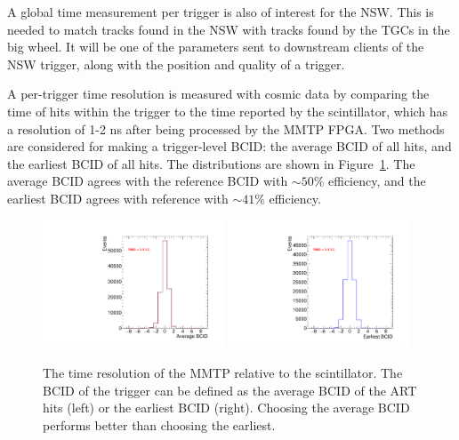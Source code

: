 A global time measurement per trigger is also of interest for the NSW. This is needed to match tracks found in the NSW with tracks found by the TGCs in the big wheel. It will be one of the parameters sent to downstream clients of the NSW trigger, along with the position and quality of a trigger.

A per-trigger time resolution is measured with cosmic data by comparing the time of hits within the trigger to the time reported by the scintillator, which has a resolution of 1-2 ns after being processed by the MMTP FPGA. Two methods are considered for making a trigger-level BCID: the average BCID of all hits, and the earliest BCID of all hits. The distributions are shown in Figure~\ref{fig:timeres}. The average BCID agrees with the reference BCID with $\sim\!50\%$ efficiency, and the earliest BCID agrees with reference with $\sim\!41\%$ efficiency.

\begin{figure}[!htpb]
  \begin{center}
    \includegraphics[width=0.48\textwidth]{figures/gbtanalysis3522/avg_BCID.pdf}
    \includegraphics[width=0.48\textwidth]{figures/gbtanalysis3522/earliest_BCID.pdf}
  \end{center}
  \vspace{-10pt}
  \caption{The time resolution of the MMTP relative to the scintillator. The BCID of the trigger can be defined as the average BCID of the ART hits (left) or the earliest BCID (right). Choosing the average BCID performs better than choosing the earliest.}
  \label{fig:timeres}
\end{figure}

